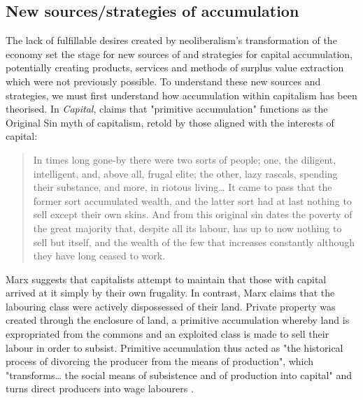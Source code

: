
\subsection{New sources/strategies of accumulation }
\label{subsec:new-sites-strategies-of-accumulation}

The lack of fulfillable desires created by neoliberalism's transformation of the economy set the stage for  new sources of and strategies for capital accumulation, potentially creating products, services and methods of surplus value extraction which were not previously possible. To understand these new sources and strategies, we must first understand how accumulation within capitalism has been theorised. In \emph{Capital},  \citet[p. 736]{marx_capital_1889} claims that "primitive accumulation" functions as the Original Sin myth of capitalism, retold by those aligned with the interests of capital:

\begin{quote}
In times long gone-by there were two sorts of people; one, the diligent, intelligent, and, above all, frugal elite; the other, lazy rascals, spending their substance, and more, in riotous living\ldots{} It came to pass that the former sort accumulated wealth, and the latter sort had at last nothing to sell except their own skins. And from this original sin dates the poverty of the great majority that, despite all its labour, has up to now nothing to sell but itself, and the wealth of the few that increases constantly although they have long ceased to work.
\end{quote}

Marx suggests that capitalists attempt to maintain that those with capital arrived at it simply by their own frugality. In contrast, Marx claims that the labouring class were actively dispossessed of their land. Private property was created through the enclosure of land, a primitive accumulation whereby land is expropriated from the commons and an exploited class is made to sell their labour  in order to subsist. Primitive accumulation thus acted as "the historical process of divorcing the producer from the means of production", which "transforms\ldots{} the social means of subsistence and of production into capital" and turns direct producers into wage labourers \citep[p. 785]{marx_capital_1889}. 

